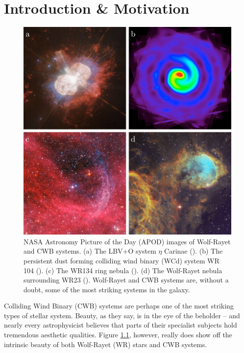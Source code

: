 \chapter{Introduction \& Motivation}

\begin{figure}[H]
  \centering
  \includegraphics[width=5in]{assets/wolf-rayets/wolf-rayets.png}
  \caption[\emph{NASA APOD images of Wolf-Rayet and CWB systems}]{NASA Astronomy Picture of the Day (APOD) images of Wolf-Rayet and CWB systems. (a) The LBV+O system $\eta$ Carinae (). (b) The persistent dust forming colliding wind binary (WCd) system WR 104 (). (c) The WR134 ring nebula (). (d) The Wolf-Rayet nebula surrounding WR23 (). Wolf-Rayet and CWB systems are, without a doubt, some of the most striking systems in the galaxy.}
  \label{fig:cwbexamples}
\end{figure}

Colliding Wind Binary (CWB) systems are perhaps one of the most striking types of stellar system.
Beauty, as they say, is in the eye of the beholder -- and nearly every astrophysicist believes that parts of their specialist subjects hold tremendous aesthetic qualities.
Figure \ref{fig:cwbexamples}, however, really does show off the intrinsic beauty of both Wolf-Rayet (WR) stars and CWB systems.

